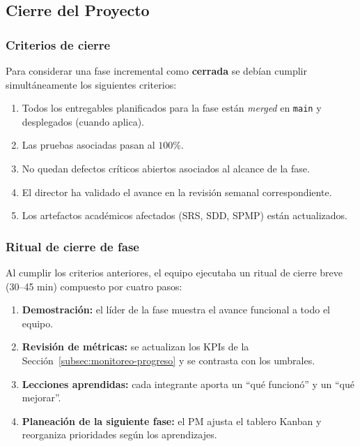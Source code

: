 \documentclass[12pt,oneside]{report}
\begin{document}
    \subsection{Cierre del Proyecto}
    \label{subsec:cierre-proyecto}

      \subsubsection{Criterios de cierre}
      Para considerar una fase incremental como \textbf{cerrada} se debían cumplir simultáneamente los siguientes criterios:
      \begin{enumerate}
        \item Todos los entregables planificados para la fase están \textit{merged} en \texttt{main} y desplegados (cuando aplica).
        \item Las pruebas asociadas pasan al $100\%$.
        \item No quedan defectos críticos abiertos asociados al alcance de la fase.
        \item El director ha validado el avance en la revisión semanal correspondiente.
        \item Los artefactos académicos afectados (SRS, SDD, SPMP) están actualizados.
      \end{enumerate}

      \subsubsection{Ritual de cierre de fase}
      Al cumplir los criterios anteriores, el equipo ejecutaba un ritual de cierre breve (30--45 min) compuesto por cuatro pasos:
      \begin{enumerate}
        \item \textbf{Demostración:} el líder de la fase muestra el avance funcional a todo el equipo.
        \item \textbf{Revisión de métricas:} se actualizan los KPIs de la Sección~\ref{subsec:monitoreo-progreso} y se contrasta con los umbrales.
        \item \textbf{Lecciones aprendidas:} cada integrante aporta un ``qué funcionó'' y un ``qué mejorar''.
        \item \textbf{Planeación de la siguiente fase:} el PM ajusta el tablero Kanban y reorganiza prioridades según los aprendizajes.
      \end{enumerate}
\end{document}
